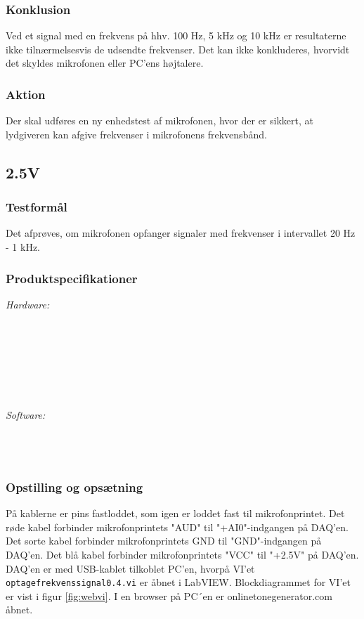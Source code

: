 		\subsubsection{Konklusion}
	Ved et signal med en frekvens på hhv. 100 Hz, 5 kHz og 10 kHz er resultaterne ikke tilnærmelsesvis de udsendte frekvenser. 
	Det kan ikke konkluderes, hvorvidt det skyldes mikrofonen eller PC'ens højtalere. 
		\subsubsection{Aktion}
		Der skal udføres en ny enhedstest af mikrofonen, hvor der er sikkert, at lydgiveren kan afgive frekvenser i mikrofonens frekvensbånd. 
		
\subsection{\elektretto 2.5V}
		\subsubsection{Testformål}
		Det afprøves, om mikrofonen opfanger signaler med frekvenser i intervallet 20 Hz - 1 kHz.
		
		\subsubsection{Produktspecifikationer}
	
			\textit{Hardware:}\\
			\elektretto\\
			\pinstre\\
			\mikrofonkabel\\
			\krympeflex\\
			\daq\\
			\daqusb\\			
			\PC\\
	
			\textit{Software:}\\
			\labview\\
			\daqsoft\\
			\onlineg\\

	
		\subsubsection{Opstilling og opsætning}
		På kablerne er pins fastloddet, som igen er loddet fast til mikrofonprintet. Det røde kabel forbinder mikrofonprintets "AUD" til "+AI0"-indgangen på DAQ'en. Det sorte kabel forbinder mikrofonprintets GND til "GND"-indgangen på DAQ'en. Det blå kabel forbinder mikrofonprintets "VCC" til "+2.5V" på DAQ'en. DAQ'en er med USB-kablet tilkoblet PC'en, hvorpå VI'et \texttt{optagefrekvenssignal0.4.vi} er åbnet i LabVIEW. Blockdiagrammet for VI'et er vist i figur \ref{fig:webvi}. I en browser på PC´en er onlinetonegenerator.com åbnet.       
		

